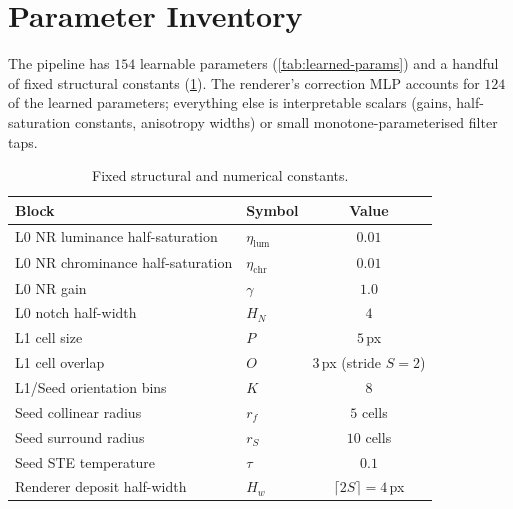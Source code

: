 \documentclass[11pt,a4paper]{article}
\begin{document}
\section{Parameter Inventory}\label{sec:params}

The pipeline has $154$ learnable parameters (\cref{tab:learned-params}) and a handful of fixed structural constants (\cref{tab:fixed-params}). The renderer's correction MLP accounts for $124$ of the learned parameters; everything else is interpretable scalars (gains, half-saturation constants, anisotropy widths) or small monotone-parameterised filter taps.

\begin{table}[h]
\centering
\caption{Fixed structural and numerical constants.}
\label{tab:fixed-params}
\renewcommand{\arraystretch}{1.15}
\begin{tabular}{llc}
\toprule
Block & Symbol & Value\\
\midrule
L0 NR luminance half-saturation & $\eta_{\mathrm{lum}}$ & $0.01$ \\
L0 NR chrominance half-saturation & $\eta_{\mathrm{chr}}$ & $0.01$ \\
L0 NR gain & $\gamma$ & $1.0$ \\
L0 notch half-width & $H_N$ & $4$ \\
L1 cell size & $P$ & $5$\,px \\
L1 cell overlap & $O$ & $3$\,px (stride $S = 2$) \\
L1/Seed orientation bins & $K$ & $8$ \\
Seed collinear radius & $r_f$ & $5$ cells \\
Seed surround radius & $r_S$ & $10$ cells \\
Seed STE temperature & $\tau$ & $0.1$ \\
Renderer deposit half-width & $H_w$ & $\lceil 2 S \rceil = 4$\,px \\
\bottomrule
\end{tabular}
\end{table}
\end{document}
